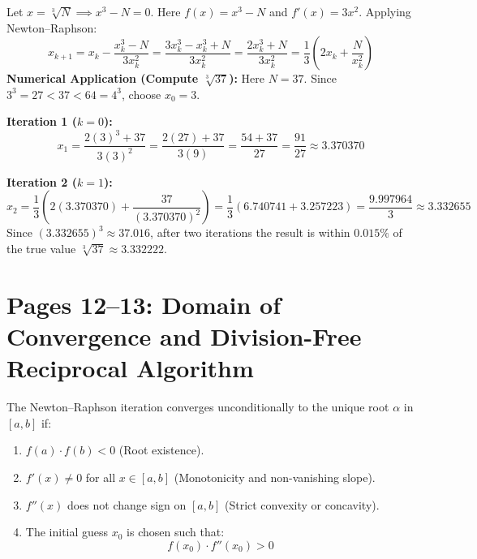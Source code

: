 \begin{examplebox}
Let $x = \sqrt[3]{N} \implies x^3 - N = 0$.
Here $f(x) = x^3 - N$ and $f'(x) = 3x^2$. Applying Newton--Raphson:
\begin{equation}
    x_{k+1} = x_k - \frac{x_k^3 - N}{3x_k^2} = \frac{3x_k^3 - x_k^3 + N}{3x_k^2} = \boxed{\frac{2x_k^3 + N}{3x_k^2} = \frac{1}{3}\left( 2x_k + \frac{N}{x_k^2} \right)}
\end{equation}
\textbf{Numerical Application (Compute $\sqrt[3]{37}$):}
Here $N = 37$. Since $3^3 = 27 < 37 < 64 = 4^3$, choose $x_0 = 3$.

\textbf{Iteration 1 ($k = 0$):}
\begin{equation}
    x_1 = \frac{2(3)^3 + 37}{3(3)^2} = \frac{2(27) + 37}{3(9)} = \frac{54 + 37}{27} = \frac{91}{27} \approx \mathbf{3.370370}
\end{equation}

\textbf{Iteration 2 ($k = 1$):}
\begin{equation}
    x_2 = \frac{1}{3}\left( 2(3.370370) + \frac{37}{(3.370370)^2} \right) = \frac{1}{3}(6.740741 + 3.257223) = \frac{9.997964}{3} \approx \mathbf{3.332655}
\end{equation}
Since $(3.332655)^3 \approx 37.016$, after two iterations the result is within $0.015\%$ of the true value $\sqrt[3]{37} \approx 3.332222$.
\end{examplebox}

\section{Pages 12--13: Domain of Convergence and Division-Free Reciprocal Algorithm}
\label{sec:page12_13_convergence_conditions}

\begin{theorembox}
The Newton--Raphson iteration converges unconditionally to the unique root $\alpha$ in $[a, b]$ if:
\begin{enumerate}
    \item $f(a) \cdot f(b) < 0$ (Root existence).
    \item $f'(x) \ne 0$ for all $x \in [a, b]$ (Monotonicity and non-vanishing slope).
    \item $f''(x)$ does not change sign on $[a, b]$ (Strict convexity or concavity).
    \item The initial guess $x_0$ is chosen such that:
    \begin{equation}
        \boxed{f(x_0) \cdot f''(x_0) > 0}
    \end{equation}
\end{enumerate}
\end{theorembox}

